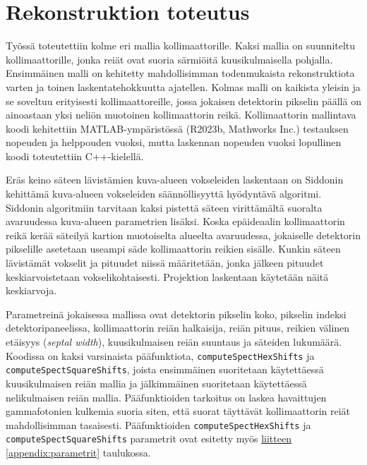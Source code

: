 \section{Rekonstruktion toteutus}
Työssä toteutettiin kolme eri mallia kollimaattorille. Kaksi mallia on suunniteltu kollimaattorille, jonka reiät ovat suoria särmiöitä kuusikulmaisella pohjalla. Ensimmäinen malli on kehitetty mahdollisimman todenmukaista rekonstruktiota varten ja toinen laskentatehokkuutta ajatellen. Kolmas malli on kaikista yleisin ja se soveltuu erityisesti kollimaattoreille, jossa jokaisen detektorin pikselin päällä on ainoastaan yksi neliön muotoinen kollimaattorin reikä\cite{weng_energy-optimized_2016}. Kollimaattorin mallintava koodi kehitettiin MATLAB-ympäristössä (R2023b, Mathworks Inc.) testauksen nopeuden ja helppouden vuoksi, mutta laskennan nopeuden vuoksi lopullinen koodi toteutettiin C++-kielellä.

Eräs keino säteen lävistämien kuva-alueen vokseleiden laskentaan on Siddonin kehittämä kuva-alueen vokseleiden säännöllisyyttä hyödyntävä algoritmi\cite{siddon_fast_1985, sundermann_fast_1998}. Siddonin algoritmiin tarvitaan kaksi pistettä säteen virittämältä suoralta avaruudessa kuva-alueen parametrien lisäksi\cite{sundermann_fast_1998}. Koska epäideaalin kollimaattorin reikä kerää säteilyä kartion muotoiselta alueelta avaruudessa\cite{cherry_single_2012}, jokaiselle detektorin pikselille asetetaan useampi säde kollimaattorin reikien sisälle. Kunkin säteen lävistämät vokselit ja pituudet niissä määritetään, jonka jälkeen pituudet keskiarvoistetaan vokselikohtaisesti. Projektion laskentaan käytetään näitä keskiarvoja.

Parametreinä jokaisessa mallissa ovat detektorin pikselin koko, pikselin indeksi detektoripaneelissa, kollimaattorin reiän halkaisija, reiän pituus, reikien välinen etäisyys (\textit{septal width}), kuusikulmaisen reiän suuntaus ja säteiden lukumäärä. Koodissa on kaksi varsinaista pääfunktiota, \texttt{computeSpectHexShifts} ja \texttt{computeSpectSquareShifts}, joista ensimmäinen suoritetaan käytettäessä kuusikulmaisen reiän mallia ja jälkimmäinen suoritetaan käytettäessä nelikulmaisen reiän mallia. Pääfunktioiden tarkoitus on laskea havaittujen gammafotonien kulkemia suoria siten, että suorat täyttävät kollimaattorin reiät mahdollisimman tasaisesti. Pääfunktioiden \texttt{computeSpectHexShifts} ja \texttt{computeSpectSquareShifts} parametrit ovat esitetty myös \hyperref[appendix:parametrit]{liitteen \ref*{appendix:parametrit}} taulukossa.

